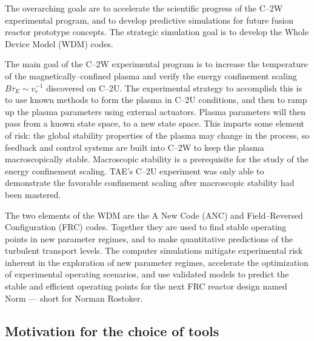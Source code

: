 \documentclass[a4paper,openany,12pt]{book}
\begin{document}
The overarching goals are to accelerate the scientific progress of the C--2W experimental program, and to develop predictive simulations for future fusion reactor prototype concepts. The strategic simulation goal is to develop the Whole Device Model (WDM) codes.

The main goal of the C--2W experimental program is to increase the temperature of the magnetically--confined plasma and verify the energy confinement scaling $B\tau_E\sim v_e^{-1}$ discovered on C--2U. The experimental strategy to accomplish this is to use known methods to form the plasma in C--2U conditions, and then to ramp up the plasma parameters using external actuators. Plasma parameters will then pass from a known state space, to a new state space. This imparts some element of risk: the global stability properties of the plasma may change in the process, so feedback and control systems are built into C--2W to keep the plasma macroscopically stable. Macroscopic stability is a prerequisite for the study of the energy confinement scaling. TAE's C--2U experiment was only able to demonstrate the favorable confinement scaling after macroscopic stability had been mastered.

The two elements of the WDM are the A New Code (ANC) and Field--Reversed Configuration (FRC) codes. Together they are used to find stable operating points in new parameter regimes, and to make quantitative predictions of the turbulent transport levels. The computer simulations mitigate experimental risk inherent in the exploration of new parameter regimes, accelerate the optimization of experimental operating scenarios, and use validated models to predict the stable and efficient operating points for the next FRC reactor design named Norm --- short for Norman Rostoker.

\subsection{Motivation for the choice of tools}
\end{document}
